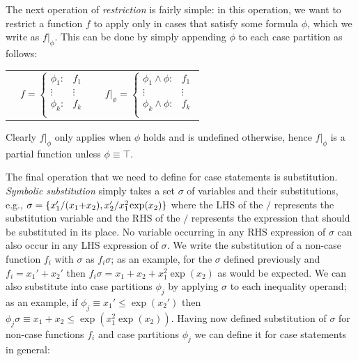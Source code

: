 \documentclass[letterpaper]{article}
\begin{document}
The next operation of \emph{restriction} is fairly simple: in this
operation, we want to restrict a function $f$ to apply only in cases
that satisfy some formula $\phi$, which we write as $f|_{\phi}$.  
This can be done by simply appending $\phi$ to each case partition
as follows:
{\footnotesize
\begin{center}
\begin{tabular}{r c c l}
&
\hspace{-6mm} 
  $f = \begin{cases}
    \phi_1: & f_1 \\ 
   \vdots&\vdots\\ 
    \phi_k: & f_k \\ 
  \end{cases}$
&

&
\hspace{-2mm}
  $f|_{\phi} = \begin{cases}
    \phi_1 \land \phi : & f_1 \\ 
   \vdots&\vdots\\ 
    \phi_k \land \phi : & f_k \\ 
  \end{cases}$
\end{tabular}
\end{center}
}
Clearly $f|_{\phi}$ only applies when $\phi$ holds and is
undefined otherwise, hence $f|_{\phi}$ is a partial function
unless $\phi \equiv \top$.

The final operation that we need to define for case
statements is substitution.  \emph{Symbolic substitution} simply takes
a set $\sigma$ of variables and their substitutions, e.g., 
$\sigma = \{ x_1' / (x_1 \hspace{-.8mm} + \hspace{-.8mm} x_2), x_2' / x_1^2 \hspace{-.3mm} \exp(x_2) \}$ where
the LHS of the $/$ represents the substitution variable and the
RHS of the $/$ represents 
the expression that should be substituted in its place.  No variable
occurring in any RHS expression of $\sigma$ can also occur in any 
LHS expression of $\sigma$.
We write the substitution of a non-case function $f_i$ with $\sigma$ 
as $f_i\sigma$; as an example, for the $\sigma$ defined previously and 
$f_i = x_1' + x_2'$ then $f_i\sigma = x_1 + x_2 + x_1^2 \exp(x_2)$ as
would be expected.  We can also substitute into case partitions $\phi_j$
by applying $\sigma$ to each inequality operand; as an example, if
$\phi_j \equiv x_1' \leq \exp(x_2')$ then 
$\phi_j \sigma \equiv x_1 + x_2 \leq \exp(x_1^2 \exp(x_2))$.
Having now defined substitution of $\sigma$ for non-case functions $f_i$ and case
partitions $\phi_j$ we can define it for case statements in general:
\end{document}
